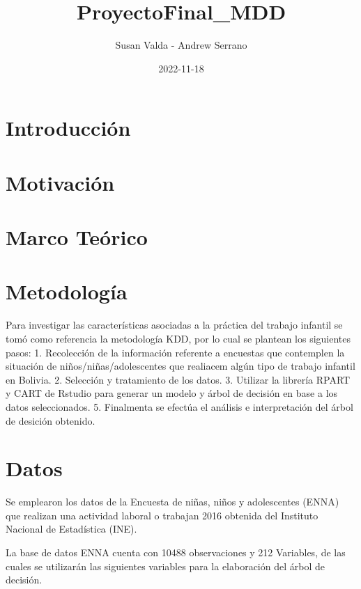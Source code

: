\documentclass[
]{article}
\title{ProyectoFinal\_MDD}
\author{Susan Valda - Andrew Serrano}
\date{2022-11-18}
\begin{document}
\maketitle

{
\setcounter{tocdepth}{2}
\tableofcontents
}
\hypertarget{introducciuxf3n}{%
\section{Introducción}\label{introducciuxf3n}}

\hypertarget{motivaciuxf3n}{%
\section{Motivación}\label{motivaciuxf3n}}

\hypertarget{marco-teuxf3rico}{%
\section{Marco Teórico}\label{marco-teuxf3rico}}

\hypertarget{metodologuxeda}{%
\section{Metodología}\label{metodologuxeda}}

Para investigar las características asociadas a la práctica del trabajo
infantil se tomó como referencia la metodología KDD, por lo cual se
plantean los siguientes pasos: 1. Recolección de la información
referente a encuestas que contemplen la situación de
niños/niñas/adolescentes que realiacem algún tipo de trabajo infantil en
Bolivia. 2. Selección y tratamiento de los datos. 3. Utilizar la
librería RPART y CART de Rstudio para generar un modelo y árbol de
decisión en base a los datos seleccionados. 5. Finalmenta se efectúa el
análisis e interpretación del árbol de desición obtenido.

\hypertarget{datos}{%
\section{Datos}\label{datos}}

Se emplearon los datos de la Encuesta de niñas, niños y adolescentes
(ENNA) que realizan una actividad laboral o trabajan 2016 obtenida del
Instituto Nacional de Estadística (INE).

La base de datos ENNA cuenta con 10488 observaciones y 212 Variables, de
las cuales se utilizarán las siguientes variables para la elaboración
del árbol de decisión.
\end{document}
